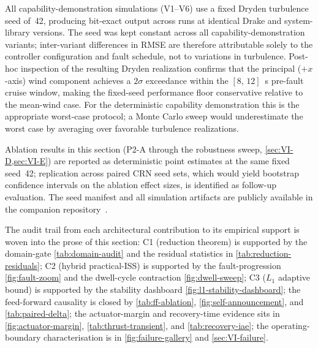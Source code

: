 \begin{remark}
\label{rem:reproducibility}
  All capability-demonstration simulations (V1--V6) use a fixed Dryden turbulence seed of~42, producing bit-exact output across runs at identical Drake and system-library versions. The seed was kept constant across all capability-demonstration variants; inter-variant differences in RMSE are therefore attributable solely to the controller configuration and fault schedule, not to variations in turbulence. Post-hoc inspection of the resulting Dryden realization confirms that the principal ($+x$-axis) wind component achieves a $2\sigma$ exceedance within the $[8,\,12]$~s pre-fault cruise window, making the fixed-seed performance floor conservative relative to the mean-wind case. For the deterministic capability demonstration this is the appropriate worst-case protocol; a Monte Carlo sweep would underestimate the worst case by averaging over favorable turbulence realizations.

  Ablation results in this section (P2-A through the robustness sweep, \cref{sec:VI-D,sec:VI-E}) are reported as deterministic point estimates at the same fixed seed~42; replication across paired CRN seed sets, which would yield bootstrap confidence intervals on the ablation effect sizes, is identified as follow-up evaluation. The seed manifest and all simulation artifacts are publicly available in the companion repository~\cite{tether_grace_code}.
\end{remark}

The audit trail from each architectural contribution to its empirical support is woven into the prose of this section: C1 (reduction theorem) is supported by the domain-gate \cref{tab:domain-audit} and the residual statistics in \cref{tab:reduction-residuals}; C2 (hybrid practical-ISS) is supported by the fault-progression \cref{fig:fault-zoom} and the dwell-cycle contraction \cref{fig:dwell-sweep}; C3 ($L_1$ adaptive bound) is supported by the stability dashboard \cref{fig:l1-stability-dashboard}; the feed-forward causality is closed by \cref{tab:ff-ablation}, \cref{fig:self-announcement}, and \cref{tab:paired-delta}; the actuator-margin and recovery-time evidence sits in \cref{fig:actuator-margin}, \cref{tab:thrust-transient}, and \cref{tab:recovery-iae}; the operating-boundary characterisation is in \cref{fig:failure-gallery} and \cref{sec:VI-failure}.
